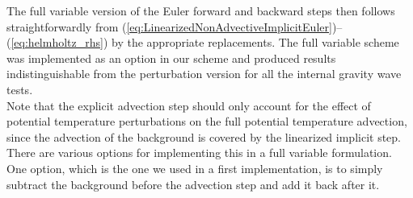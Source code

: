 \documentclass{ametsoc}
\theoremstyle{definition}
\newcommand{\eq}[1]{(\ref{#1})}
\begin{document}
\begin{appendix}[C]
{%
The full variable version of the Euler forward and backward steps then follows straightforwardly from \eq{eq:LinearizedNonAdvectiveImplicitEuler}--\eq{eq:helmholtz_rhs} by the appropriate replacements. The full variable scheme was implemented as an option in our scheme and produced results indistinguishable from the perturbation version for all the internal gravity wave tests.\\Note that the explicit advection step should only account for the effect of potential temperature perturbations on the full potential temperature advection, since the advection of the background is covered by the linearized implicit step. There are various options for implementing this in a full variable formulation. One option, which is the one we used in a first implementation, is to simply subtract the background before the advection step and add it back after it.} 

\end{appendix}





\end{document}

